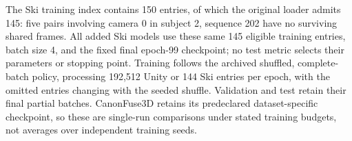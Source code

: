 The Ski training index contains 150 entries, of which the original loader admits 145: five pairs involving camera 0 in subject 2, sequence 202 have no surviving shared frames. All added Ski models use these same 145 eligible training entries, batch size 4, and the fixed final epoch-99 checkpoint; no test metric selects their parameters or stopping point. Training follows the archived shuffled, complete-batch policy, processing 192,512 Unity or 144 Ski entries per epoch, with the omitted entries changing with the seeded shuffle. Validation and test retain their final partial batches. CanonFuse3D retains its predeclared dataset-specific checkpoint, so these are single-run comparisons under stated training budgets, not averages over independent training seeds.

